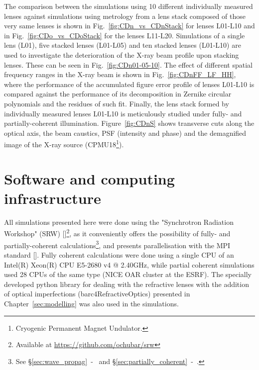 \begin{refsection}
The comparison between the simulations using 10 different individually measured lenses against simulations using metrology from a lens stack composed of those very same lenses is shown in Fig.~\ref{fig:CDn_vs_CDnStack} for lenses L01-L10 and in Fig.~\ref{fig:CDo_vs_CDoStack} for the lenses L11-L20. Simulations of a single lens (L01), five stacked lenses (L01-L05) and ten stacked lenses (L01-L10) are used to investigate the deterioration of the X-ray beam profile upon stacking lenses. These can be seen in Fig.~\ref{fig:CDn01-05-10}. The effect of different spatial frequency ranges in the X-ray beam is shown in Fig.~\ref{fig:CDnFF_LF_HH}, where the performance of the accumulated figure error profile of lenses L01-L10 is compared against the performance of its decomposition in Zernike circular polynomials and the residues of such fit. Finally, the lens stack formed by individually measured lenses L01-L10 is meticulously studied under fully- and partially-coherent illumination. Figure~\ref{fig:CDnS} shows transverse cuts along the optical axis, the beam caustics, PSF (intensity and phase) and the demagnified image of the X-ray source (CPMU18\footnote{Cryogenic Permanent Magnet Undulator.}).

\section{Software and computing infrastructure}\label{sec:SRW}

All simulations presented here were done using the "Synchrotron Radiation Workshop" (SRW) [\cite{Chubar1998}]\footnote{Available at \url{https://github.com/ochubar/srw}}, as it conveniently offers the possibility of fully- and partially-coherent calculations\footnote{See \S\ref{sec:wave_propag}~-~\textit{} and \S\ref{sec:partially_coherent}~-~\textit{}.}, and presents parallelisation with the MPI standard [\cite{Chubar2011}]. Fully coherent calculations were done using a single CPU of an Intel(R) Xeon(R) CPU E5-2680 v4 @ 2.40GHz, while partial coherent simulations used 28 CPUs of the same type (NICE OAR cluster at the ESRF). The specially developed python library for dealing with the refractive lenses with the addition of optical imperfections (barc4RefractiveOptics) presented in Chapter~\ref{sec:modelling} was also used in the simulations.


\end{refsection}
